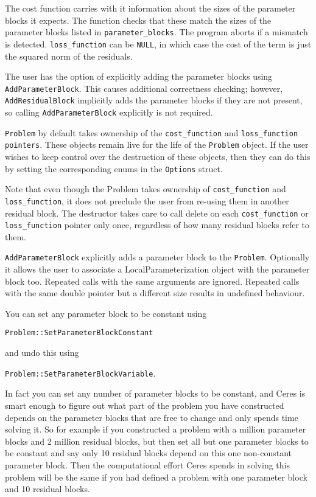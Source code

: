 The cost
   function carries with it information about the sizes of the
   parameter blocks it expects. The function checks that these match
   the sizes of the parameter blocks listed in \texttt{parameter\_blocks}. The
   program aborts if a mismatch is detected. \texttt{loss\_function} can be
   \texttt{NULL}, in which case the cost of the term is just the squared norm
   of the residuals.

  The user has the option of explicitly adding the parameter blocks
  using \texttt{AddParameterBlock}. This causes additional correctness
  checking; however, \texttt{AddResidualBlock} implicitly adds the parameter
   blocks if they are not present, so calling \texttt{AddParameterBlock}
   explicitly is not required.

  
   \texttt{Problem} by default takes ownership of the
  \texttt{cost\_function} and \texttt{loss\_function pointers}. These objects remain
   live for the life of the \texttt{Problem} object. If the user wishes to
  keep control over the destruction of these objects, then they can
  do this by setting the corresponding enums in the \texttt{Options} struct.
  

  Note that even though the Problem takes ownership of \texttt{cost\_function}
  and \texttt{loss\_function}, it does not preclude the user from re-using
  them in another residual block. The destructor takes care to call
  delete on each \texttt{cost\_function} or \texttt{loss\_function} pointer only once,
  regardless of how many residual blocks refer to them.

\texttt{AddParameterBlock} explicitly adds a parameter block to the \texttt{Problem}. Optionally it allows the user to associate a LocalParameterization object with the parameter block too. Repeated calls with the same arguments are ignored. Repeated
calls with the same double pointer but a different size results in undefined behaviour.

You can set any parameter block to be constant using 

\texttt{Problem::SetParameterBlockConstant} 

and undo this using

\texttt{Problem::SetParameterBlockVariable}.

In fact you can set any number of parameter blocks to be constant, and Ceres is smart enough to figure out what part of the problem you have constructed depends on the parameter blocks that are free to change and only spends time solving it. So for example if you constructed a problem with a million parameter blocks and 2 million residual blocks, but then set all but one parameter blocks to be constant and say only 10 residual blocks depend on this one non-constant parameter block. Then the computational effort Ceres spends in solving this problem will be the same if you had defined a problem with one parameter block and 10 residual blocks.

